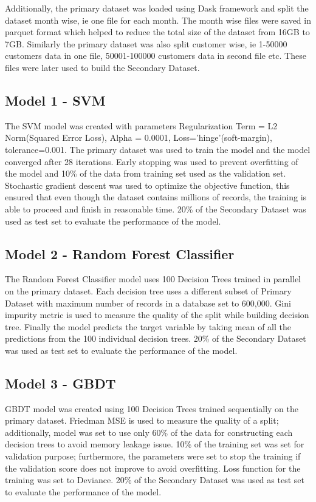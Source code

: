 \documentclass[twoside,11pt,a4paper]{article}
\begin{document}
Additionally, the primary dataset was loaded using Dask framework and split the dataset month wise, ie one file for each month. The month wise files were saved in parquet format which helped to reduce the total size of the dataset from 16GB to 7GB. Similarly the primary dataset was also split customer wise, ie 1-50000 customers data in one file, 50001-100000 customers data in second file etc. These files were later used to build the Secondary Dataset.

\subsection{Model 1 - \acf{SVM}}
The \acs{SVM} model was created with parameters Regularization Term = L2 Norm(Squared Error Loss), Alpha = 0.0001, Loss='hinge'(soft-margin), tolerance=0.001. The primary dataset was used to train the model and the model converged after 28 iterations. Early stopping was used to prevent overfitting of the model and 10\% of the data from training set used as the validation set. Stochastic gradient descent was used to optimize the objective function, this ensured that even though the dataset contains millions of records, the training is able to proceed and finish in reasonable time.  20\% of the Secondary Dataset was used as test set to evaluate the performance of the model.
\subsection{Model 2 - Random Forest Classifier}
The Random Forest Classifier model uses 100 Decision Trees trained in parallel on the primary dataset. Each decision tree uses a different subset of Primary Dataset with maximum number of records in a database set to 600,000. Gini impurity metric is used to measure the quality of the split while building decision tree. Finally the model predicts the target variable by taking mean of all the predictions from the 100 individual decision trees. 20\% of the Secondary Dataset was used as test set to evaluate the performance of the model.
\subsection{Model 3 - \acf{GBDT}}
\acs{GBDT} model was created using 100 Decision Trees trained sequentially on the primary dataset. Friedman \acf{MSE} is used to measure the quality of a split; additionally, model was set to use only 60\% of the data for constructing each decision trees to avoid memory leakage issue. 10\% of the training set was set for validation purpose; furthermore, the parameters were set to stop the training if the validation score does not improve to avoid overfitting. Loss function for the training was set to Deviance. 20\% of the Secondary Dataset was used as test set to evaluate the performance of the model.
\end{document}

